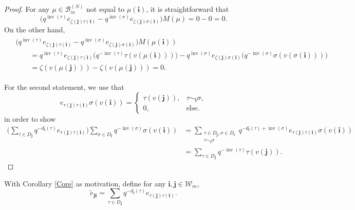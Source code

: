 \documentclass[11pt]{article}
\numberwithin{equation}{section}
\numberwithin{equation}{section}
\DeclareMathOperator{\inv}{inv}
\newcommand{\ii}{{\mathbf{i}}}
\newcommand{\jj}{{\mathbf{j}}}
\begin{document}
\begin{proof}
For any $\mu \in \mathcal{B}^{(N)}_m$ not equal to $\mu(\ii)$, it is straightforward that
\[
\big(q^{\inv(\tau)}e_{\zeta(\jj) \tau(\ii)} - q^{\inv(\sigma)}e_{\zeta(\jj) \sigma(\ii)} \big) M(\mu)=0-0=0.
\]
On the other hand,
\begin{gather*}
\begin{split}
&\big(q^{\inv(\tau)}e_{\zeta(\jj) \tau(\ii)} - q^{\inv(\sigma)}e_{\zeta(\jj) \sigma(\ii)} \big) M(\mu(\ii))\\
&\qquad = q^{\inv(\tau)}e_{\zeta(\jj) \tau(\ii)} \big(q^{-\inv(\tau)} \tau(v(\mu(\ii)) )\big) - q^{\inv(\sigma)}e_{\zeta(\jj) \sigma(\ii)} \big(q^{-\inv(\sigma)} \sigma(v(\sigma(\ii)) )\big) \\
&\qquad = \zeta(v(\mu(\jj))) - \zeta(v(\mu(\jj)))=0.
\end{split}
\end{gather*}

For the second statement, we use that
\[
e_{\tau(\jj)\tau(\ii)}\sigma(v(\ii))
=
\begin{cases}
\tau(v(\jj)), & \tau \sim_{\ii} \sigma, \\
0, & \text{else.}
\end{cases}
\]
in order to show
\begin{align*}
\bigg( \sum_{\tau \in D_{\jj}} q^{-d_{\ii}(\tau)}e_{\tau(\jj)\tau(\ii)} \bigg) \sum_{\sigma \in D_{\ii}} q^{-\inv(\sigma)} \sigma(v(\ii)) &= \sum_{\substack{\tau \in D_{\jj},\sigma \in D_{\ii} \\ \tau\sim_{\ii} \sigma}}q^{-d_{\ii}(\tau)+ \inv(\sigma)} e_{\tau(\jj)\tau(\ii)}\sigma(v(\ii))\\
&= \sum_{\tau \in D_{\jj}} q^{-\inv(\tau)} \tau(v(\jj)).\tag*{\qed}
\end{align*}\renewcommand{\qed}{}
\end{proof}


With Corollary \ref{Core} as motivation, define for any $\ii,\jj \in \mathcal{W}_m$,
\[
\tilde{e}_{\jj \ii} = \sum_{\tau \in D_{\jj}} q^{-d_{\ii}(\tau)}e_{\tau(\jj)\tau(\ii)} .
\]
\end{document}
